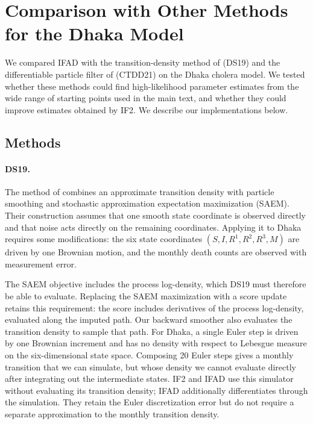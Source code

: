 \documentclass[11pt]{article}
\theoremstyle{thmstylethree}%
\begin{document}
\clearpage
\section{Comparison with Other Methods for the Dhaka Model}
\label{sec:dhaka-competitors}

We compared IFAD with the transition-density method of \citet{ditlevsen19}
(DS19) and the differentiable particle filter of \citet{corenflos21}
(CTDD21) on the Dhaka
cholera model. We tested whether these methods could find high-likelihood
parameter estimates from the wide range of starting points used in the
main text, and whether they could improve estimates obtained by IF2.
We describe our implementations below.

\subsection{Methods}

\paragraph{DS19.}
The method of \citet{ditlevsen19} combines an approximate transition density
with particle smoothing and stochastic approximation expectation
maximization (SAEM). Their construction assumes that one smooth state
coordinate is observed directly and that noise acts directly on the
remaining coordinates. Applying it to Dhaka requires some modifications:
the six state coordinates $(S,I,R^1,R^2,R^3,M)$ are driven by one Brownian
motion, and the monthly death counts are observed with measurement error.

The SAEM objective includes the process log-density, which DS19 must
therefore be able to evaluate. Replacing the
SAEM maximization with a score update retains this requirement: the score
includes derivatives of the process log-density, evaluated along the
imputed path. Our backward smoother also evaluates the transition density
to sample that path. For Dhaka, a single Euler step is driven by one
Brownian increment and has no density with respect to Lebesgue measure
on the six-dimensional state space. Composing 20 Euler steps gives a
monthly transition that we can
simulate, but whose density we cannot evaluate directly after integrating
out the intermediate states. IF2 and IFAD use this simulator without
evaluating its transition density; IFAD additionally differentiates
through the simulation. They retain the Euler discretization error but
do not require a separate approximation to the monthly transition density.
\end{document}
